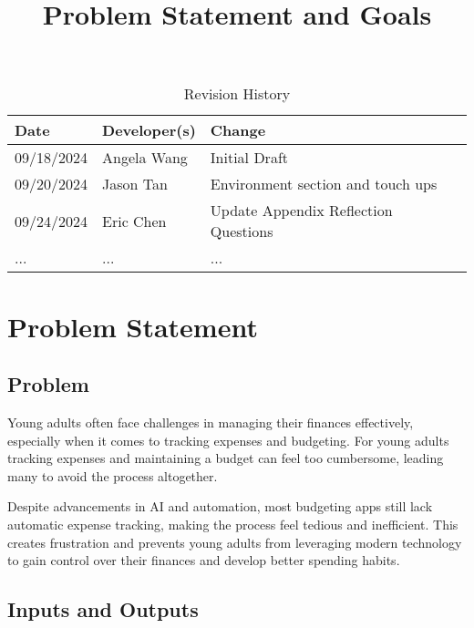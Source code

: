 \documentclass{article}
\title{Problem Statement and Goals\\\progname}
\author{\authname}
\date{}
\begin{document}
\maketitle

\begin{table}[hp]
\caption{Revision History} \label{TblRevisionHistory}
\begin{tabularx}{\textwidth}{llX}
\toprule
\textbf{Date} & \textbf{Developer(s)} & \textbf{Change}\\
\midrule
09/18/2024 & Angela Wang & Initial Draft\\
09/20/2024 & Jason Tan & Environment section and touch ups\\
09/24/2024 & Eric Chen & Update Appendix Reflection Questions\\
... & ... & ...\\
\bottomrule
\end{tabularx}
\end{table}

\section{Problem Statement}



\subsection{Problem}

Young adults often face challenges in managing their finances effectively,
especially when it comes to tracking expenses and budgeting. For young adults
tracking expenses and maintaining a budget can feel too cumbersome, leading many
to avoid the process altogether. 

Despite advancements in AI and automation, most budgeting apps still lack
automatic expense tracking, making the process feel tedious and inefficient.
This creates frustration and prevents young adults from leveraging modern
technology to gain control over their finances and develop better spending
habits.


\subsection{Inputs and Outputs}
\end{document}
